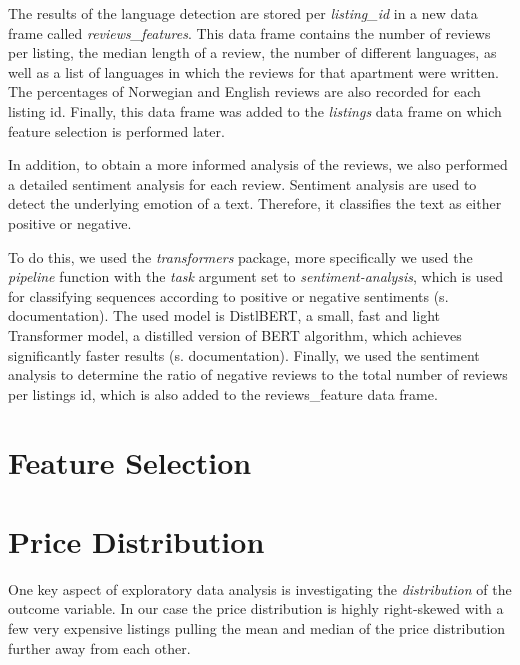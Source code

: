 \documentclass[12pt, letterpaper]{article}
\begin{document}

The results of the language detection are stored per \textit{listing\_id} in a new data frame called \textit{reviews\_features}.
This data frame contains the number of reviews per listing, the median length of a review, the number of different languages, as well as a list of languages in which the reviews for that apartment were written.
The percentages of Norwegian and English reviews are also recorded for each listing id.
Finally, this data frame was added to the \textit{listings} data frame on which feature selection is performed later.

In addition, to obtain a more informed analysis of the reviews, we also performed a detailed sentiment analysis for each review. Sentiment analysis are used to detect the underlying emotion of a text.
Therefore, it classifies the text as either positive or negative.

To do this, we used the \textit{transformers} package, more specifically we used the \textit{pipeline} function with the \textit{task} argument set to \textit{sentiment-analysis}, which is used for classifying sequences according to positive or negative sentiments (s. documentation).
The used model is DistlBERT, a small, fast and light Transformer model, a distilled version of BERT algorithm, which achieves significantly faster results (s. documentation).
Finally, we used the sentiment analysis to determine the ratio of negative reviews to the total number of reviews per listings id, which is also added to the reviews\_feature data frame.




\section{Feature Selection}


\section{Price Distribution}

One key aspect of exploratory data analysis is investigating the \emph{distribution} of the outcome variable.
In our case the price distribution is highly right-skewed with a few very expensive listings pulling the mean and median of the price distribution further away from each other.
\end{document}
